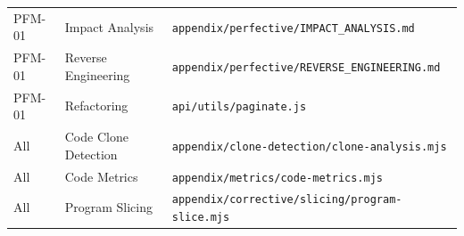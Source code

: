 \documentclass[11pt,a4paper]{article}
\begin{document}
\begin{longtable}{@{}p{3cm}p{3.2cm}p{7.1cm}@{}}
PFM-01 & Impact Analysis     & \texttt{appendix/perfective/IMPACT\_ANALYSIS.md} \\
PFM-01 & Reverse Engineering & \texttt{appendix/perfective/REVERSE\_ENGINEERING.md} \\
PFM-01 & Refactoring         & \texttt{api/utils/paginate.js} \\[3pt]
All    & Code Clone Detection & \texttt{appendix/clone-detection/clone-analysis.mjs} \\
All    & Code Metrics         & \texttt{appendix/metrics/code-metrics.mjs} \\
All    & Program Slicing      & \texttt{appendix/corrective/slicing/program-slice.mjs} \\
\bottomrule
\end{longtable}
\end{document}
